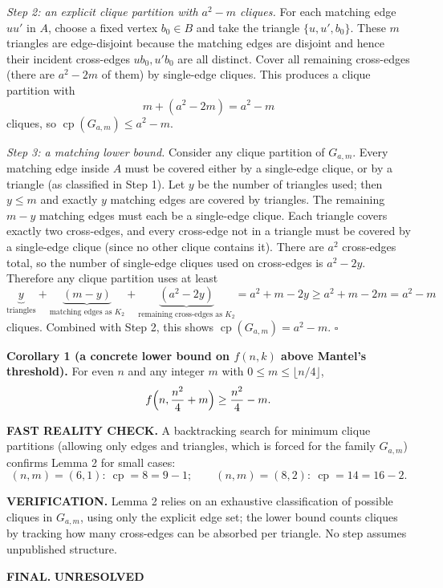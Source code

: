 \emph{Step 2: an explicit clique partition with $a^2-m$ cliques.}
For each matching edge $uu'$ in $A$, choose a fixed vertex $b_0\in B$ and take the triangle $\{u,u',b_0\}$.
These $m$ triangles are edge-disjoint because the matching edges are disjoint and hence their incident cross-edges $ub_0,u'b_0$ are all distinct.
Cover all remaining cross-edges (there are $a^2-2m$ of them) by single-edge cliques.
This produces a clique partition with
\[
m + (a^2-2m)=a^2-m\]
cliques, so $\operatorname{cp}(G_{a,m})\le a^2-m$.

\emph{Step 3: a matching lower bound.}
Consider any clique partition of $G_{a,m}$.
Every matching edge inside $A$ must be covered either by a single-edge clique, or by a triangle (as classified in Step 1).
Let $y$ be the number of triangles used; then $y\le m$ and exactly $y$ matching edges are covered by triangles.
The remaining $m-y$ matching edges must each be a single-edge clique.
Each triangle covers exactly two cross-edges, and every cross-edge not in a triangle must be covered by a single-edge clique (since no other clique contains it).
There are $a^2$ cross-edges total, so the number of single-edge cliques used on cross-edges is $a^2-2y$.
Therefore any clique partition uses at least
\[
\underbrace{y}_{\text{triangles}} + \underbrace{(m-y)}_{\text{matching edges as }K_2} + \underbrace{(a^2-2y)}_{\text{remaining cross-edges as }K_2}
= a^2+m-2y\ge a^2+m-2m=a^2-m
\]
cliques.
Combined with Step 2, this shows $\operatorname{cp}(G_{a,m})=a^2-m$.
\hfill$\square$

\medskip
\noindent\textbf{Corollary 1 (a concrete lower bound on $f(n,k)$ above Mantel's threshold).}
For even $n$ and any integer $m$ with $0\le m\le \lfloor n/4\rfloor$,
\[
f\Bigl(n,\frac{n^2}{4}+m\Bigr)\ge \frac{n^2}{4}-m.
\]

\medskip
\noindent\textbf{FAST REALITY CHECK.}
A backtracking search for minimum clique partitions (allowing only edges and triangles, which is forced for the family $G_{a,m}$) confirms Lemma 2 for small cases:
\[
(n,m)=(6,1):\ \operatorname{cp}=8=9-1;\qquad (n,m)=(8,2):\ \operatorname{cp}=14=16-2.
\]

\medskip
\noindent\textbf{VERIFICATION.}
Lemma 2 relies on an exhaustive classification of possible cliques in $G_{a,m}$, using only the explicit edge set; the lower bound counts cliques by tracking how many cross-edges can be absorbed per triangle.
No step assumes unpublished structure.

\medskip
\noindent\textbf{FINAL.}
\textbf{UNRESOLVED}

